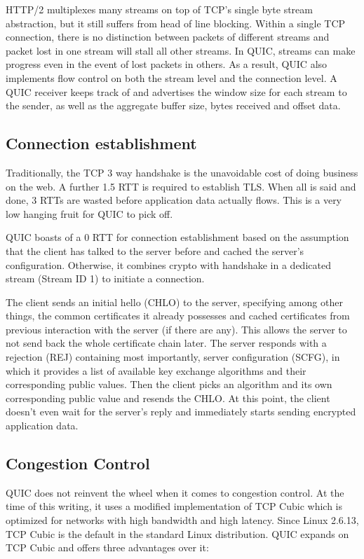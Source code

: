 \documentclass{sig-alternate-05-2015}
\begin{document}
HTTP/2 multiplexes many streams on top of TCP's single byte stream abstraction, but it still suffers from head of line blocking. Within a single TCP connection, there is no distinction between packets of different streams and packet lost in one stream will stall all other streams. In QUIC, streams can make progress even in the event of lost packets in others. As a result, QUIC also implements flow control on both the stream level and the connection level. A QUIC receiver keeps track of and advertises the window size for each stream to the sender, as well as the aggregate buffer size, bytes received and offset data. \cite{quic:draft}

\subsection{Connection establishment}
Traditionally, the TCP 3 way handshake is the unavoidable cost of doing business on the web. A further 1.5 RTT is required to establish TLS. When all is said and done, 3 RTTs are wasted before application data actually flows. This is a very low hanging fruit for QUIC to pick off. 

QUIC boasts of a 0 RTT for connection establishment based on the assumption that the client has talked to the server before and cached the server's configuration. Otherwise, it combines crypto with handshake in a dedicated stream (Stream ID 1) to initiate a connection.

The client sends an initial hello (CHLO) to the server, specifying among other things, the common certificates it already possesses and cached certificates from previous interaction with the server (if there are any). This allows the server to not send back the whole certificate chain later. The server responds with a rejection (REJ) containing most importantly, server configuration (SCFG), in which it provides a list of available key exchange algorithms and their corresponding public values. Then the client picks an algorithm and its own corresponding public value and resends the CHLO. At this point, the client doesn't even wait for the server's reply and immediately starts sending encrypted application data. \cite{quic:crypto}

\subsection{Congestion Control}
QUIC does not reinvent the wheel when it comes to congestion control. At the time of this writing, it uses a modified implementation of TCP Cubic which is optimized for networks with high bandwidth and high latency. Since Linux 2.6.13, TCP Cubic is the default in the standard Linux distribution. QUIC expands on TCP Cubic and offers three advantages\cite{quic:draft} over it:
\end{document}
